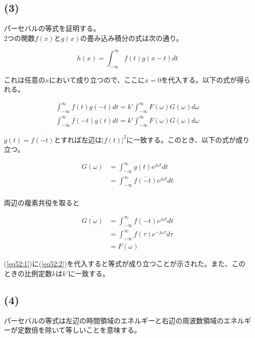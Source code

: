 \documentclass[a4paper,12pt,xelatex,ja=standard]{bxjsarticle}
\begin{document}
\subsection*{(3)}
パーセバルの等式を証明する。\\
2つの関数$f(x)$と$g(x)$の畳み込み積分の式は次の通り。

\[
  h(x) = \int^{\infty}_{- \infty}f(t)g(x - t) dt
\]

これは任意の$x$において成り立つので、ここに$x = 0$を代入する。以下の式が得られる。

\begin{equation}
  \begin{split}
    \label{eq52:1}
    \int^{\infty}_{- \infty}f(t)g(-t) dt = k' \int^{\infty}_{- \infty}F(\omega) G(\omega) d \omega \\
    \int^{\infty}_{- \infty}f(-t)g(t) dt = k' \int^{\infty}_{- \infty}F(\omega) G(\omega) d \omega
  \end{split}
\end{equation}

$g(t) = \overline{f(-t)}$とすれば左辺は$|f(t)|^2$に一致する。このとき、以下の式が成り立つ。

\begin{equation}
  \begin{split}
    G(\omega)
      &= \int^{\infty}_{- \infty} g(t) e^{j \omega t} dt \\
      &= \int^{\infty}_{- \infty} \overline{f(-t)} e^{j \omega t} dt \\
  \end{split}
\end{equation}

両辺の複素共役を取ると

\begin{equation}
  \begin{split}
    \label{eq52:2}
    \overline{G(\omega)}
      &= \int^{\infty}_{- \infty} f(-t) e^{j \omega t} dt \\
      &= \int^{\infty}_{- \infty} f(\tau) e^{-j \omega \tau} d\tau \\
      &= F(\omega)
  \end{split}
\end{equation}

(\ref{eq52:1})に(\ref{eq52:2})を代入すると等式が成り立つことが示された。また、このときの比例定数$k$は$k'$に一致する。

\subsection*{(4)}

パーセバルの等式は左辺の時間領域のエネルギーと右辺の周波数領域のエネルギーが定数倍を除いて等しいことを意味する。
\end{document}
